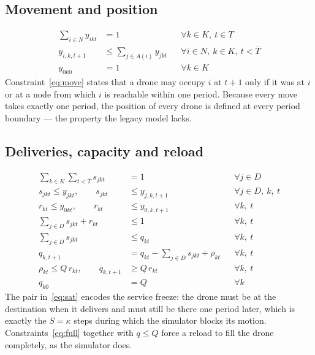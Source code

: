 \documentclass[11pt]{article}
\begin{document}
\subsection{Movement and position}

\begin{align}
\sum_{i \in N} y_{ikt} &= 1 && \forall k \in K,\ t \in T \label{eq:one}\\
y_{i,k,t+1} &\le \sum_{j \in A(i)} y_{jkt} && \forall i \in N,\ k \in K,\ t < \bar{T} \label{eq:move}\\
y_{0k0} &= 1 && \forall k \in K \label{eq:start}
\end{align}
Constraint~\eqref{eq:move} states that a drone may occupy $i$ at $t+1$ only if it was at $i$
or at a node from which $i$ is reachable within one period. Because every move takes exactly
one period, the position of every drone is defined at every period boundary --- the property
the legacy model lacks.

\subsection{Deliveries, capacity and reload}

\begin{align}
\sum_{k \in K} \sum_{t < \bar{T}} s_{jkt} &= 1 && \forall j \in D \label{eq:serve}\\
s_{jkt} \le y_{jkt}, \qquad s_{jkt} &\le y_{j,k,t+1} && \forall j \in D,\ k,\ t \label{eq:sat}\\
r_{kt} \le y_{0kt}, \qquad r_{kt} &\le y_{0,k,t+1} && \forall k,\ t \label{eq:rat}\\
\sum_{j \in D} s_{jkt} + r_{kt} &\le 1 && \forall k,\ t \label{eq:busy}\\
\sum_{j \in D} s_{jkt} &\le q_{kt} && \forall k,\ t \label{eq:cap}\\
q_{k,t+1} &= q_{kt} - \sum_{j \in D} s_{jkt} + \rho_{kt} && \forall k,\ t \label{eq:bal}\\
\rho_{kt} \le Q\, r_{kt}, \qquad q_{k,t+1} &\ge Q\, r_{kt} && \forall k,\ t \label{eq:full}\\
q_{k0} &= Q && \forall k \label{eq:load0}
\end{align}
The pair in~\eqref{eq:sat} encodes the service freeze: the drone must be at the destination
when it delivers and must still be there one period later, which is exactly the $S = \kappa$
steps during which the simulator blocks its motion. Constraints~\eqref{eq:full} together with
$q \le Q$ force a reload to fill the drone completely, as the simulator does.
\end{document}
